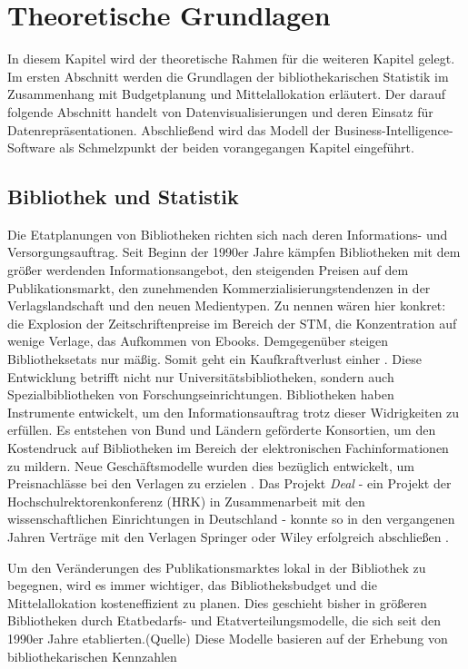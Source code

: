 \chapter{Theoretische Grundlagen}
\label{chap:two}
In diesem Kapitel wird der theoretische Rahmen für die weiteren Kapitel gelegt. Im
ersten Abschnitt werden die Grundlagen der bibliothekarischen Statistik im Zusammenhang mit Budgetplanung
und Mittelallokation erläutert. Der darauf folgende Abschnitt handelt von Datenvisualisierungen und deren Einsatz
für Datenrepräsentationen. Abschließend wird das Modell der Business-Intelligence-Software als Schmelzpunkt der 
beiden vorangegangen Kapitel eingeführt.

\section{Bibliothek und Statistik}
\label{chap:two_one}
Die Etatplanungen von Bibliotheken richten sich nach deren Informations- und Versorgungsauftrag. 
Seit Beginn der 1990er Jahre kämpfen Bibliotheken mit dem größer werdenden Informationsangebot, den steigenden Preisen auf dem Publikationsmarkt, 
den zunehmenden Kommerzialisierungstendenzen in der Verlagslandschaft und den neuen Medientypen. 
Zu nennen wären hier konkret: die Explosion der Zeitschriftenpreise im Bereich der \acrfull{STM}, die Konzentration auf wenige Verlage, 
das Aufkommen von Ebooks. Demgegenüber steigen Bibliotheksetats nur mäßig. 
Somit geht ein Kaufkraftverlust einher \cite[Vgl.][161]{moravetz-kuhlmann_monika_erwerbungspolitik_2015}.
Diese Entwicklung betrifft nicht nur Universitätsbibliotheken, sondern auch Spezialbibliotheken von Forschungseinrichtungen.
Bibliotheken haben Instrumente entwickelt, um den Informationsauftrag trotz dieser Widrigkeiten zu erfüllen.
Es entstehen von Bund und Ländern geförderte Konsortien, um den Kostendruck auf Bibliotheken im Bereich der elektronischen
Fachinformationen zu mildern. Neue Geschäftsmodelle wurden dies bezüglich entwickelt, um Preisnachlässe bei den Verlagen zu erzielen
\cite[Vgl.][169 ff.]{moravetz-kuhlmann_monika_erwerbungspolitik_2015}. Das Projekt \textit{Deal} - ein Projekt der Hochschulrektorenkonferenz (HRK) in Zusammenarbeit mit den
wissenschaftlichen Einrichtungen in Deutschland - konnte so in den vergangenen Jahren Verträge mit den Verlagen Springer oder Wiley erfolgreich abschließen \cite[Vgl.][]{projekt_deal_projekt_2020}.

Um den Veränderungen des Publikationsmarktes lokal in der Bibliothek zu begegnen, wird es immer wichtiger, das Bibliotheksbudget und die Mittelallokation kosteneffizient zu planen. 
Dies geschieht bisher in größeren Bibliotheken durch Etatbedarfs- und Etatverteilungsmodelle, die sich seit den 1990er Jahre etablierten.(Quelle) 
Diese Modelle basieren auf der Erhebung von bibliothekarischen Kennzahlen \cite[Vgl.][172 ff.]{moravetz-kuhlmann_monika_erwerbungspolitik_2015}

